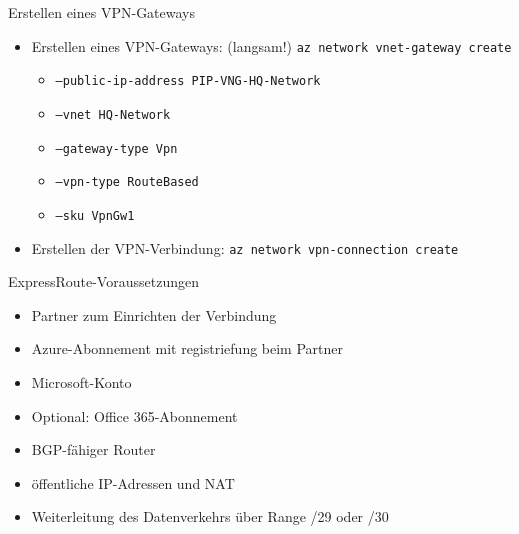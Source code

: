 \begin{flashcard}[Definition]{Erstellen eines VPN-Gateways}
    \begin{itemize}
        \item Erstellen eines VPN-Gateways: (langsam!)\newline
            \texttt{az network vnet-gateway create}
            \begin{itemize}
                \item \texttt{--public-ip-address PIP-VNG-HQ-Network}
                \item \texttt{--vnet HQ-Network}
                \item \texttt{--gateway-type Vpn}
                \item \texttt{--vpn-type RouteBased}
                \item \texttt{--sku VpnGw1}
            \end{itemize}
        \item Erstellen der VPN-Verbindung:\newline
            \texttt{az network vpn-connection create}
    \end{itemize}
\end{flashcard}



\begin{flashcard}[Definition]{ExpressRoute-Voraussetzungen}
    \begin{itemize}
        \item Partner zum Einrichten der Verbindung
        \item Azure-Abonnement mit registriefung beim Partner
        \item Microsoft-Konto
        \item Optional: Office 365-Abonnement
        \item BGP-fähiger Router
        \item öffentliche IP-Adressen und NAT
        \item Weiterleitung des Datenverkehrs über Range /29 oder /30
    \end{itemize}
\end{flashcard}

